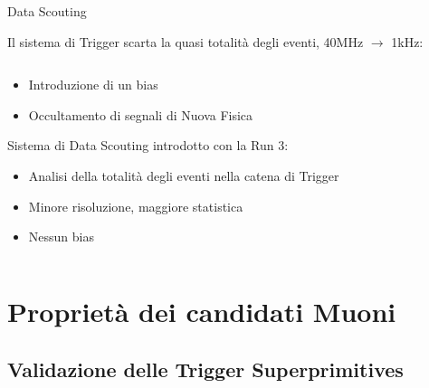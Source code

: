\documentclass{beamer}
\begin{document}
\begin{frame}{Data Scouting}

Il sistema di Trigger scarta la quasi totalità degli eventi, 40MHz $\rightarrow$ 1kHz:


\begin{columns}
    \begin{column}{0.50\textwidth}
        \begin{itemize}            
            \item Introduzione di un bias 
            \item Occultamento di segnali di Nuova Fisica
        \end{itemize}
        \vspace{0.2 cm}
        Sistema di Data Scouting introdotto con la Run 3:
        \begin{itemize}
            \item Analisi della totalità degli eventi nella catena di Trigger
            \item Minore risoluzione, maggiore statistica
            \item Nessun bias

        \end{itemize}
    \end{column}
    \begin{column}{0.4\textwidth}  
    \centering
    \vspace{0.4cm}
    \end{column}
\end{columns}
    
\end{frame}




\section{Proprietà dei candidati Muoni}
\subsection{Validazione delle Trigger  Superprimitives}
\end{document}
